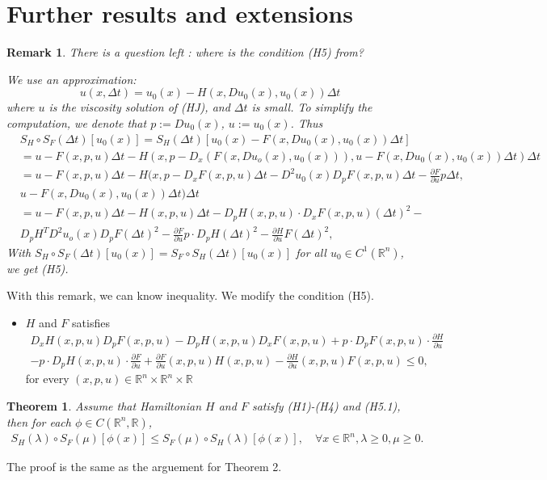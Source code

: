 \documentclass[preprint]{elsarticle}
\newtheorem{result}{\textbf{Theorem}}
\newtheorem{remark}{Remark}[section]
\numberwithin{equation}{section}
\begin{document}
\section{Further results and extensions}
\begin{remark}
    There is a question left : where is the condition (H5) from? 
    
    We use an approximation:
    \begin{equation}
        u(x,\Delta t)=u_0(x)-H(x,Du_0(x),u_0(x))\Delta t
    \end{equation}
    where $u$ is the viscosity solution of (HJ), and $\Delta t$ is small. To simplify the computation, we denote that $p:=Du_0(x)$, $u:=u_0(x)$.
    Thus 
    \begin{align*}
        &S_H \circ S_F(\Delta t)[u_0(x)]=S_H(\Delta t)[u_0(x)-F(x,Du_0(x),u_0(x))\Delta t]\\
        &=u-F(x,p,u)\Delta t-H(x,p-D_x(F(x,Du_o(x),u_0(x))),u-F(x,Du_0(x),u_0(x))\Delta t)\Delta t\\
        &=u-F(x,p,u)\Delta t-H(x,p-D_xF(x,p,u)\Delta t-D^2u_0(x)D_pF(x,p,u)\Delta t-\frac{\partial F}{\partial u}p\Delta t,\\
        &u-F(x,Du_0(x),u_0(x))\Delta t)\Delta t\\
        &=u-F(x,p,u)\Delta t-H(x,p,u)\Delta t-D_pH(x,p,u)\cdot D_xF(x,p,u)(\Delta t)^2-\\
        &D_pH^TD^2u_o(x)D_pF(\Delta t)^2-\frac{\partial F}{\partial u}p\cdot D_pH(\Delta t)^2-\frac{\partial H}{\partial u}F(\Delta t)^2,
    \end{align*}
    With $S_H \circ S_F(\Delta t)[u_0(x)]=S_F \circ S_H(\Delta t)[u_0(x)]$ for all $u_0\in C^1(\mathbb R^n)$, we get (H5).
\end{remark}
With this remark, we can know inequality. We modify the condition (H5).
\begin{itemize}
    \item[(H5.1)] $H$ and $F$ satisfies 
     \begin{align*}
          D_x H(x,p,u) D_pF(x,p,u)- D_p H(x,p,u) D_xF(x,p,u) + p \cdot D_pF(x,p,u) \cdot \frac{\partial H}{\partial u} 
          \\ - p \cdot D_pH(x,p,u) \cdot \frac{\partial F}{\partial u} + \frac{\partial F}{\partial u}(x,p,u) H(x,p,u)-\frac{\partial H}{\partial u}(x,p,u) F(x,p,u)\leq 0,
     \end{align*}
     for every $(x,p,u) \in \mathbb R^n \times \mathbb R^n \times \mathbb R$
\end{itemize}
\begin{result}
     Assume that Hamiltonian $H$ and $F$ satisfy (H1)-(H4) and (H5.1), then for each $\phi \in  C(\mathbb R^n,\mathbb R)$, 
     \begin{align}
         S_H(\lambda) \circ S_F(\mu)[\phi(x)]\leq S_F(\mu) \circ S_H(\lambda)[\phi(x)], \quad\forall x \in \mathbb R^n, \lambda \geq 0, \mu \geq 0.
     \end{align}
\end{result}
The proof is the same as the arguement for Theorem 2.
\end{document}
